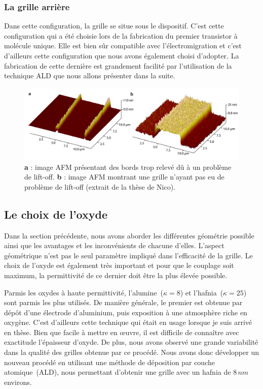 \subsubsection{La grille arrière}
Dans cette configuration, la grille se situe sous le dispositif. C'est cette configuration qui a été choisie lors de la fabrication du premier transistor à molécule unique. Elle est bien s\^ur compatible avec l'électromigration et c'est d'ailleurs cette configuration que nous avons également choisi d'adopter. La fabrication de cette dernière est grandement facilité par l'utilisation de la technique ALD que nous allons présenter dans la suite.

\begin{figure}
\centering \includegraphics[scale=0.45]{Fabrication/BatmanGrille/BatmanGrille.pdf}
\caption{\textbf{a} : image AFM présentant des bords trop relevé d\^u à un problème de lift-off. \textbf{b} : image AFM montrant une grille n'ayant pas eu de problème de lift-off (extrait de la thèse de Nico).}
\label{lift-off}
\end{figure}



\subsection{Le choix de l'oxyde}
Dans la section précédente, nous avons aborder les différentes géométrie possible ainsi que les avantages et les inconvénients de chacune d'elles. L'aspect géométrique n'est pas le seul paramètre impliqué dans l’efficacité de la grille. Le choix de l'oxyde est également très important et pour que le couplage soit maximum, la permittivité de ce dernier doit être la plus élevée possible.

Parmis les oxydes à haute permittivité, l'alumine~($\kappa=8$) et l'hafnia~($\kappa=25$) sont parmis les plus utilisés. De manière générale, le premier est obtenue par dépôt d'une électrode d'aluminium, puis exposition à une atmosphère riche en oxygène. C'est d'ailleurs cette technique qui était en usage lorsque je suis arrivé en thèse. Bien que facile à mettre en œuvre, il est difficile de connaître avec exactitude l'épaisseur d'oxyde. De plus, nous avons observé une grande variabilité dans la qualité des grilles obtenue par ce procédé. Nous avons donc développer un nouveau procédé en utilisant une méthode de déposition par couche atomique~(ALD), nous permettant d'obtenir une grille avec un hafnia de $8\,nm$ environs.


